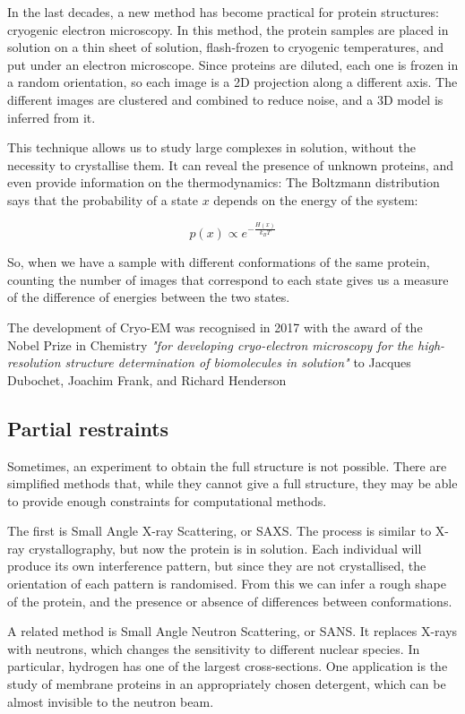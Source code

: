 In the last decades, 
a new method has become practical for protein structures: cryogenic electron microscopy.
In this method, the protein samples are placed in solution on a thin sheet of solution, flash-frozen to cryogenic temperatures, and put under an electron microscope.
Since proteins are diluted, each one is frozen in a random orientation, so each image is a 2D projection along a different axis.
The different images are clustered and combined to reduce noise, and a 3D model is inferred from it.

This technique allows us to study large complexes in solution, without the necessity to crystallise them.
It can reveal the presence of unknown proteins, and even provide information on the thermodynamics:
The Boltzmann distribution says that the probability of a state $x$ depends on the energy of the system:

\begin{equation*}
p(x) \propto e^{-\frac{H(x)}{k_B T}}
\end{equation*}

So, when we have a sample with different conformations of the same protein, counting the number of images that correspond to each state gives us a measure of the difference of energies between the two states.

The development of Cryo-EM was recognised in 2017 with the award of the Nobel Prize in Chemistry \emph{"for developing cryo-electron microscopy for the high-resolution structure determination of biomolecules in solution"} to Jacques Dubochet, Joachim Frank, and Richard Henderson


\subsection{Partial restraints}
Sometimes, an experiment to obtain the full structure is not possible.
There are simplified methods that, while they cannot give a full structure, they may be able to provide enough constraints for computational methods.

The first is Small Angle X-ray Scattering, or SAXS. 
The process is similar to X-ray crystallography, but now the protein is in solution.
Each individual will produce its own interference pattern, but since they are not crystallised, the orientation of each pattern is randomised.
From this we can infer a rough shape of the protein, and the presence or absence of differences between conformations.

A related method is Small Angle Neutron Scattering, or SANS. 
It replaces X-rays with neutrons, which changes the sensitivity to different nuclear species.
In particular, hydrogen has one of the largest cross-sections.
One application is the study of membrane proteins in an appropriately chosen detergent, which can be almost invisible to the neutron beam.

